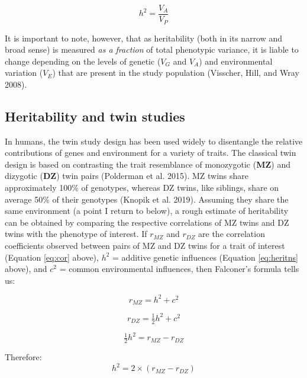 \documentclass[
]{book}
\begin{document}
\begin{equation}
h^2 = \frac{V_A}{V_P} \label{eq:heritns}
\end{equation}

It is important to note, however, that as heritability (both in its narrow and broad sense) is measured \emph{as a fraction} of total phenotypic variance, it is liable to change depending on the levels of genetic (\(V_G\) and \(V_A\)) and environmental variation (\(V_E\)) that are present in the study population (Visscher, Hill, and Wray 2008).

\hypertarget{heritability-and-twin-studies}{%
\subsection{Heritability and twin studies}\label{heritability-and-twin-studies}}

In humans, the twin study design has been used widely to disentangle the relative contributions of genes and environment for a variety of traits. The classical twin design is based on contrasting the trait resemblance of monozygotic (\textbf{MZ}) and dizygotic (\textbf{DZ}) twin pairs (Polderman et al. 2015). MZ twins share approximately 100\% of genotypes, whereas DZ twins, like siblings, share on average 50\% of their genotypes (Knopik et al. 2019). Assuming they share the same environment (a point I return to below), a rough estimate of heritability can be obtained by comparing the respective correlations of MZ twins and DZ twins with the phenotype of interest. If \(r_{MZ}\) and \(r_{DZ}\) are the correlation coefficients observed between pairs of MZ and DZ twins for a trait of interest (Equation \eqref{eq:cor} above), \(h^2\) = additive genetic influences (Equation \eqref{eq:heritns} above), and \(c^2\) = common environmental influences, then Falconer's formula tells us:

\begin{equation}
r_{MZ} = h^2 + c^2
\end{equation}

\begin{equation}
r_{DZ} = \tfrac{1}{2}h^2 + c^2
\end{equation}

\begin{equation}
\tfrac{1}{2}h^2 = r_{MZ} - r_{DZ}
\end{equation}

Therefore:
\begin{equation}
h^2 = 2\times(r_{MZ} - r_{DZ})
\end{equation}
\end{document}
